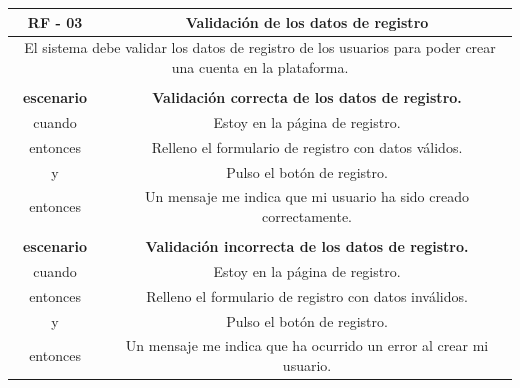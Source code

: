         \begin{table}[!htbp]
            \centering

            \begin{tabular}{|c|c|}
                \hline
                \textbf{RF - 03} & \textbf{Validación de los datos de registro} \\
                \hline
                \multicolumn{2}{|p{15cm}|}{
                    El sistema debe validar los datos de registro de los usuarios para poder crear una cuenta en la plataforma.
                } \\
                \hline
                \multicolumn{2}{|p{15cm}|}{
                } \\
                \hline
                \textbf{escenario} & \textbf{Validación correcta de los datos de registro.} \\
                cuando & Estoy en la página de registro. \\
                entonces & Relleno el formulario de registro con datos válidos. \\
                y & Pulso el botón de registro. \\
                entonces & Un mensaje me indica que mi usuario ha sido creado correctamente. \\
                \hline
                \multicolumn{2}{|p{15cm}|}{
                } \\
                \hline
                \textbf{escenario} & \textbf{Validación incorrecta de los datos de registro.} \\
                cuando & Estoy en la página de registro. \\
                entonces & Relleno el formulario de registro con datos inválidos. \\
                y & Pulso el botón de registro. \\
                entonces & Un mensaje me indica que ha ocurrido un error al crear mi usuario. \\
                \hline
            \end{tabular}
        \end{table}

